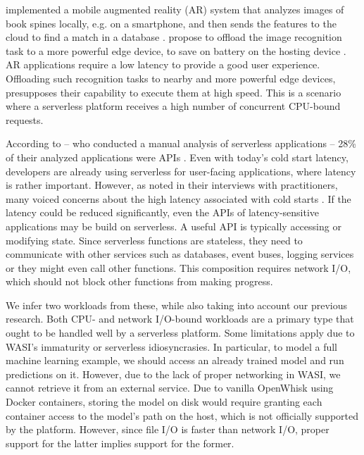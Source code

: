 \begin{description}[style=multiline, leftmargin=2.5cm, font=\bfseries]
    \item[Augmented Reality] \citeauthor{Huang2012} implemented a mobile augmented reality (AR) system that analyzes images of book spines locally, e.g. on a smartphone, and then sends the features to the cloud to find a match in a database \cite{Huang2012}. \citeauthor{Baresi2019} propose to offload the image recognition task to a more powerful edge device, to save on battery on the hosting device \cite{Baresi2019}. AR applications require a low latency to provide a good user experience. Offloading such recognition tasks to nearby and more powerful edge devices, presupposes their capability to execute them at high speed. This is a scenario where a serverless platform receives a high number of concurrent CPU-bound requests.

    \item[APIs] According to \citeauthor{Eismann2021a} -- who conducted a manual analysis of serverless applications -- 28\% of their analyzed applications were APIs \cite{Eismann2021a}. Even with today's cold start latency, developers are already using serverless for user-facing applications, where latency is rather important. However, as \citeauthor{Leitner2019} noted in their interviews with practitioners, many voiced concerns about the high latency associated with cold starts \cite{Leitner2019}. If the latency could be reduced significantly, even the APIs of latency-sensitive applications may be build on serverless. A useful API is typically accessing or modifying state. Since serverless functions are stateless, they need to communicate with other services such as databases, event buses, logging services or they might even call other functions. This composition requires network I/O, which should not block other functions from making progress.

\end{description}

We infer two workloads from these, while also taking into account our previous research. Both CPU- and network I/O-bound workloads are a primary type that ought to be handled well by a serverless platform. Some limitations apply due to WASI's immaturity or serverless idiosyncrasies. In particular, to model a full machine learning example, we should access an already trained model and run predictions on it. However, due to the lack of proper networking in WASI, we cannot retrieve it from an external service. Due to vanilla OpenWhisk using Docker containers, storing the model on disk would require granting each container access to the model's path on the host, which is not officially supported by the platform. However, since file I/O is faster than network I/O, proper support for the latter implies support for the former.

